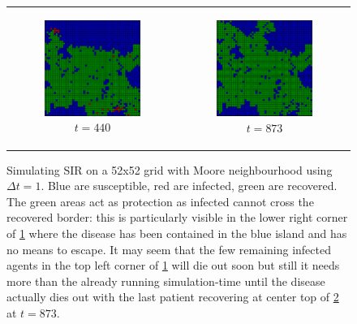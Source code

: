 \begin{figure}
\begin{center}
\begin{tabular}{c c}
		\begin{subfigure}[b]{0.4\textwidth}
			\centering
			\includegraphics[width=.6\textwidth, angle=0]{./../shared/fig/spatial/SIR_spatial_52x52_440time.png}
			\caption{$t = 440$}
			\label{fig:sir_spatial_440}
		\end{subfigure}
		
		& 
		
		\begin{subfigure}[b]{0.4\textwidth}
			\centering
			\includegraphics[width=.6\textwidth, angle=0]{./../shared/fig/spatial/SIR_spatial_52x52_873time.png}
			\caption{$t = 873$}
			\label{fig:sir_spatial_873}
		\end{subfigure}
	\end{tabular}
	
	\caption{Simulating SIR on a 52x52 grid with Moore neighbourhood using $\Delta t = 1$. Blue are susceptible, red are infected, green are recovered. The green areas act as protection as infected cannot cross the recovered border: this is particularly visible in the lower right corner of \ref{fig:sir_spatial_440} where the disease has been contained in the blue island and has no means to escape. It may seem that the few remaining infected agents in the top left corner of \ref{fig:sir_spatial_440} will die out soon but still it needs more than the already running simulation-time until the disease actually dies out with the last patient recovering at center top of \ref{fig:sir_spatial_873} at $t = 873$.} 
	\label{fig:sir_spatial}
\end{center}
\end{figure}

